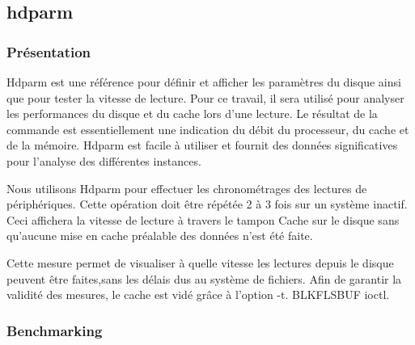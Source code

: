\documentclass[11pt]{article}
\begin{document}
\pagebreak
\subsection{hdparm}
\subsubsection{Présentation}


Hdparm est une référence pour définir et afficher les paramètres du disque ainsi que pour tester
la vitesse de lecture. Pour ce travail, il sera utilisé pour analyser les performances du disque et du cache lors d'une lecture. Le résultat de la commande est
essentiellement une indication du débit du processeur, du cache et de la mémoire.
Hdparm est facile à utiliser et fournit des données significatives pour l'analyse des 
différentes instances.

Nous utilisons Hdparm pour effectuer les chronométrages des lectures de périphériques. Cette opération doit être répétée 2 à 3 fois
sur un système inactif. Ceci affichera la vitesse de lecture à travers le tampon
Cache sur le disque sans qu'aucune mise en cache préalable des données n'est été faite.

Cette mesure permet de visualiser à quelle vitesse les lectures depuis le disque peuvent être faites,sans les délais dus au système de fichiers. Afin de garantir la validité des mesures, le cache est vidé grâce à l'option -t.
BLKFLSBUF ioctl.
\subsubsection{Benchmarking}
\end{document}
